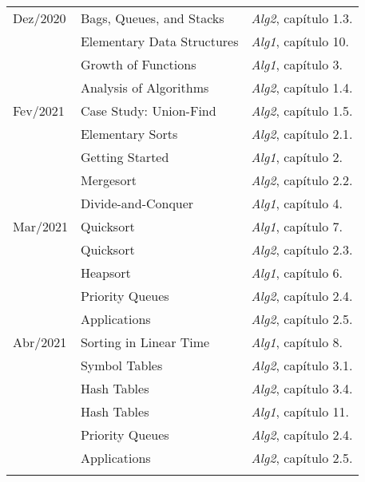 \documentclass[a4paper]{inzane_syllabus} %
\begin{document}
\begin{center}
\begin{tabularx}{\textwidth}{p{2cm}p{8cm}p{9.5cm}}
\arrayrulecolor{maingray}\hline
Dez/2020 & Bags, Queues, and Stacks   & \emph{Alg2}, capítulo 1.3. \\
         & Elementary Data Structures & \emph{Alg1}, capítulo 10.  \\
         & Growth of Functions        & \emph{Alg1}, capítulo 3.   \\
         & Analysis of Algorithms     & \emph{Alg2}, capítulo 1.4. \\

\arrayrulecolor{maingray}\hline
Fev/2021 & Case Study: Union-Find    & \emph{Alg2}, capítulo 1.5. \\
         & Elementary Sorts          & \emph{Alg2}, capítulo 2.1. \\
         & Getting Started           & \emph{Alg1}, capítulo 2.   \\
         & Mergesort                 & \emph{Alg2}, capítulo 2.2. \\
         & Divide-and-Conquer        & \emph{Alg1}, capítulo 4.   \\

\arrayrulecolor{maingray}\hline
Mar/2021 & Quicksort    & \emph{Alg1}, capítulo 7. \\
         & Quicksort    & \emph{Alg2}, capítulo 2.3. \\
         & Heapsort     & \emph{Alg1}, capítulo 6. \\
         & Priority Queues & \emph{Alg2}, capítulo 2.4.   \\
         & Applications    & \emph{Alg2}, capítulo 2.5. \\

\arrayrulecolor{maingray}\hline
Abr/2021 & Sorting in Linear Time  & \emph{Alg1}, capítulo 8.   \\
         & Symbol Tables           & \emph{Alg2}, capítulo 3.1. \\
         & Hash Tables             & \emph{Alg2}, capítulo 3.4. \\
         & Hash Tables             & \emph{Alg1}, capítulo 11.  \\
         & Priority Queues         & \emph{Alg2}, capítulo 2.4. \\
         & Applications            & \emph{Alg2}, capítulo 2.5. \\

\arrayrulecolor{maingray}\hline

\arrayrulecolor{maingray}\hline

\arrayrulecolor{maingray}\hline


\end{tabularx}
\end{center}
\end{document}

